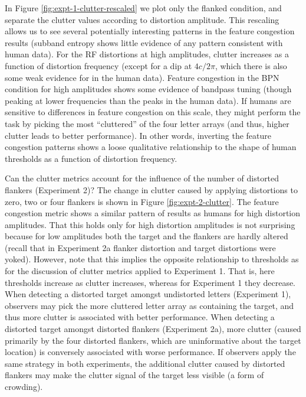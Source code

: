 \documentclass[doc, 11pt,a4paper,natbib]{apa6}\usepackage[]{graphicx}\usepackage[]{color}
\begin{document}
In Figure \ref{fig:expt-1-clutter-rescaled} we plot only the flanked condition, and separate the clutter values according to distortion amplitude.
This rescaling allows us to see several potentially interesting patterns in the feature congestion results (subband entropy shows little evidence of any pattern consistent with human data).
For the RF distortions at high amplitudes, clutter increases as a function of distortion frequency (except for a dip at $4 c/2\pi$, which there is also some weak evidence for in the human data).
Feature congestion in the BPN condition for high amplitudes shows some evidence of bandpass tuning (though peaking at lower frequencies than the peaks in the human data).
If humans are sensitive to differences in feature congestion on this scale, they might perform the task by picking the most ``cluttered'' of the four letter arrays (and thus, higher clutter leads to better performance).
In other words, inverting the feature congestion patterns shows a loose qualitative relationship to the shape of human thresholds as a function of distortion frequency.

Can the clutter metrics account for the influence of the number of distorted flankers (Experiment 2)?
The change in clutter caused by applying distortions to zero, two or four flankers is shown in Figure \ref{fig:expt-2-clutter}.
The feature congestion metric shows a similar pattern of results as humans for high distortion amplitudes.
That this holds only for high distortion amplitudes is not surprising because for low amplitudes both the target and the flankers are hardly altered (recall that in Experiment 2a flanker distortion and target distortions were yoked).
However, note that this implies the opposite relationship to thresholds as for the discussion of clutter metrics applied to Experiment 1.
That is, here thresholds increase as clutter increases, whereas for Experiment 1 they decrease.
When detecting a distorted target amongst undistorted letters (Experiment 1), observers may pick the more cluttered letter array as containing the target, and thus more clutter is associated with better performance.
When detecting a distorted target amongst distorted flankers (Experiment 2a), more clutter (caused primarily by the four distorted flankers, which are uninformative about the target location) is conversely associated with worse performance.
If observers apply the same strategy in both experiments, the additional clutter caused by distorted flankers may make the clutter signal of the target less visible (a form of crowding).
\end{document}

